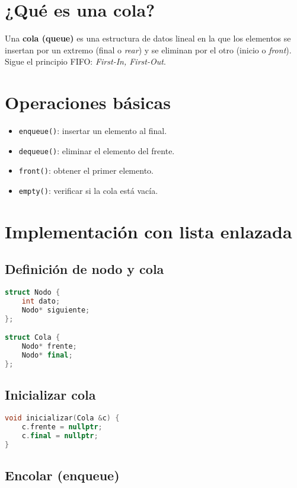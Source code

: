 \documentclass[a4paper]{article}
\begin{document}
\section{¿Qué es una cola?}

Una \textbf{cola (queue)} es una estructura de datos lineal en la que los elementos se insertan por un extremo (final o \textit{rear}) y se eliminan por el otro (inicio o \textit{front}). Sigue el principio FIFO: \textit{First-In, First-Out}.

\section{Operaciones básicas}

\begin{itemize}
    \item \texttt{enqueue()}: insertar un elemento al final.
    \item \texttt{dequeue()}: eliminar el elemento del frente.
    \item \texttt{front()}: obtener el primer elemento.
    \item \texttt{empty()}: verificar si la cola está vacía.
\end{itemize}

\section{Implementación con lista enlazada}

\subsection*{Definición de nodo y cola}

\begin{lstlisting}[language=C++]
struct Nodo {
    int dato;
    Nodo* siguiente;
};

struct Cola {
    Nodo* frente;
    Nodo* final;
};
\end{lstlisting}

\subsection*{Inicializar cola}

\begin{lstlisting}[language=C++]
void inicializar(Cola &c) {
    c.frente = nullptr;
    c.final = nullptr;
}
\end{lstlisting}

\subsection*{Encolar (enqueue)}
\end{document}
